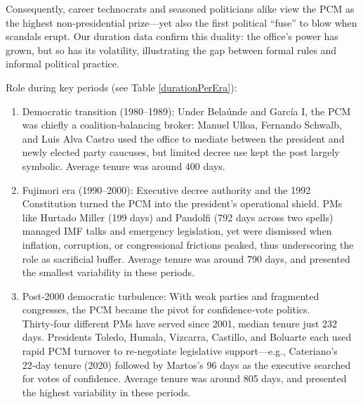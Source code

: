 \documentclass[a4paper, 12pt]{article}
\begin{document}
Consequently, career technocrats and seasoned politicians alike view the PCM as the highest non‑presidential prize—yet also the first political “fuse” to blow when scandals erupt. Our duration data confirm this duality: the office’s power has grown, but so has its volatility, illustrating the gap between formal rules and informal political practice.

Role during key periods (see Table \ref{durationPerEra}):

\begin{enumerate}
    \item Democratic transition (1980–1989): Under Belaúnde and García I, the PCM was chiefly a coalition‑balancing broker: Manuel Ulloa, Fernando Schwalb, and Luis Alva Castro used the office to mediate between the president and newly elected party caucuses, but limited decree use kept the post largely symbolic. Average tenure was around 400 days.
    \item Fujimori era (1990–2000): Executive decree authority and the 1992 Constitution turned the PCM into the president’s operational shield. PMs like Hurtado Miller (199 days) and Pandolfi (792 days across two spells) managed IMF talks and emergency legislation, yet were dismissed when inflation, corruption, or congressional frictions peaked, thus underscoring the role as sacrificial buffer. Average tenure was around 790 days, and presented the smallest variability in these periods.
    \item Post‑2000 democratic turbulence: With weak parties and fragmented congresses, the PCM became the pivot for confidence‑vote politics. Thirty‑four different PMs have served since 2001, median tenure just 232 days. Presidents Toledo, Humala, Vizcarra, Castillo, and Boluarte each used rapid PCM turnover to re‑negotiate legislative support—e.g., Cateriano’s 22‑day tenure (2020) followed by Martos’s 96 days as the executive searched for votes of confidence. Average tenure was around 805 days, and presented the highest variability in these periods.
\end{enumerate}
\end{document}
